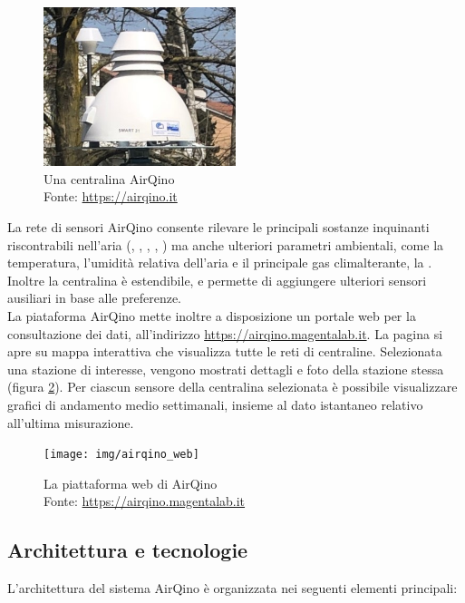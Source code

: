 \begin{figure}[H]
\centering
\captionsetup{justification=centering}
\includegraphics[width=0.50\textwidth,height=\textheight,keepaspectratio]{img/airqino_stazione}
\caption{Una centralina AirQino\\Fonte: \url{https://airqino.it}}
\label{fig:airqino_stazione}
\end{figure}

La rete di sensori AirQino consente rilevare le principali sostanze inquinanti riscontrabili nell’aria (, , , , ) ma anche ulteriori parametri ambientali, come la temperatura, l'umidità relativa dell’aria e il principale gas climalterante, la .
Inoltre la centralina è estendibile, e permette di aggiungere ulteriori sensori ausiliari in base alle preferenze.\\

La piataforma AirQino mette inoltre a disposizione un portale web per la consultazione dei dati, all'indirizzo \url{https://airqino.magentalab.it}. La pagina si apre su mappa interattiva che visualizza tutte le reti di centraline. Selezionata una stazione di interesse, vengono mostrati dettagli e foto della stazione stessa (figura \ref{fig:airqino}). Per ciascun sensore della centralina selezionata è possibile visualizzare grafici di andamento medio settimanali, insieme al dato istantaneo relativo all'ultima misurazione. \cite{airqino}

\begin{figure}[H]
\centering
\captionsetup{justification=centering}
\texttt{[image: img/airqino\_web]}
\caption{La piattaforma web di AirQino\\Fonte: \url{https://airqino.magentalab.it}}
\label{fig:airqino}
\end{figure}

\subsection{Architettura e tecnologie}\label{ssec:airqino-architettura}
L'architettura del sistema AirQino è organizzata nei seguenti elementi principali:

